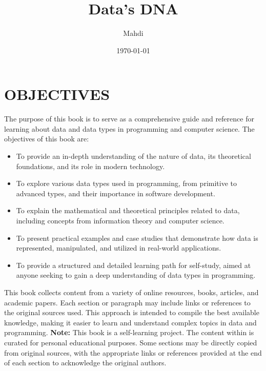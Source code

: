\documentclass[12pt, oneside]{book}
\title{{\Huge Data's DNA}}
\author{{\LARGE Mahdi}}
\date{{\large \today}}
\begin{document}
	\frontmatter
	\mainmatter
	\maketitle
	\tableofcontents
\chapter{OBJECTIVES}

The purpose of this book is to serve as a comprehensive guide and reference for learning about data and data types in programming and computer science. The objectives of this book are:

\begin{itemize}
	\item To provide an in-depth understanding of the nature of data, its theoretical foundations, and its role in modern technology.
	\item To explore various data types used in programming, from primitive to advanced types, and their importance in software development.
	\item To explain the mathematical and theoretical principles related to data, including concepts from information theory and computer science.
	\item To present practical examples and case studies that demonstrate how data is represented, manipulated, and utilized in real-world applications.
	\item To provide a structured and detailed learning path for self-study, aimed at anyone seeking to gain a deep understanding of data types in programming.
\end{itemize}
This book collects content from a variety of online resources, books, articles, and academic papers. Each section or paragraph may include links or references to the original sources used. This approach is intended to compile the best available knowledge, making it easier to learn and understand complex topics in data and programming.\vspace{0.5cm}
\textbf{Note:} This book is a self-learning project. The content within is curated for personal educational purposes. Some sections may be directly copied from original sources, with the appropriate links or references provided at the end of each section to acknowledge the original authors.
\end{document}

